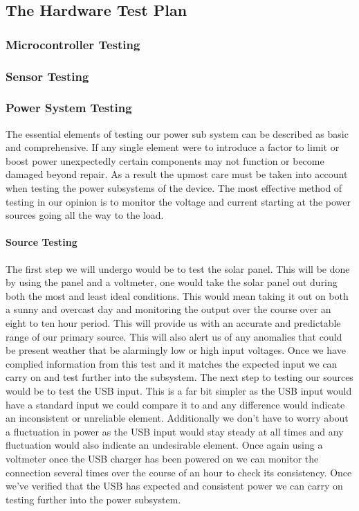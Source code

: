 \subsection{The Hardware Test Plan}
\subsubsection{Microcontroller Testing}
\subsubsection{Sensor Testing}
\subsubsection{Power System Testing}
The essential elements of testing our power sub system can be described as basic and comprehensive. If any single element were to introduce a factor to limit or boost power unexpectedly certain components may not function or become damaged beyond repair. As a result the upmost care must be taken into account when testing the power subsystems of the device. The most effective method of testing in our opinion is to monitor the voltage and current starting at the power sources going all the way to the load. 

\paragraph{Source Testing}
The first step we will undergo would be to test the solar panel. This will be done by using the panel and a voltmeter, one would take the solar panel out during both the most and least ideal conditions. This would mean taking it out on both a sunny and overcast day and monitoring the output over the course over an eight to ten hour period. This will provide us with an accurate and predictable range of our primary source. This will also alert us of any anomalies that could be present weather that be alarmingly low or high input voltages. Once we have complied information from this test and it matches the expected input we can carry on and test further into the subsystem.
The next step to testing our sources would be to test the USB input. This is a far bit simpler as the USB input would have a standard input we could compare it to and any difference would indicate an inconsistent or unreliable element. Additionally we don't have to worry about a fluctuation in power as the USB input would stay steady at all times and any fluctuation would also indicate an undesirable element. Once again using a voltmeter once the USB charger has been powered on we can monitor the connection several times over the course of an hour to check its consistency. Once we've verified that the USB has expected and consistent power we can carry on testing further into the power subsystem.

